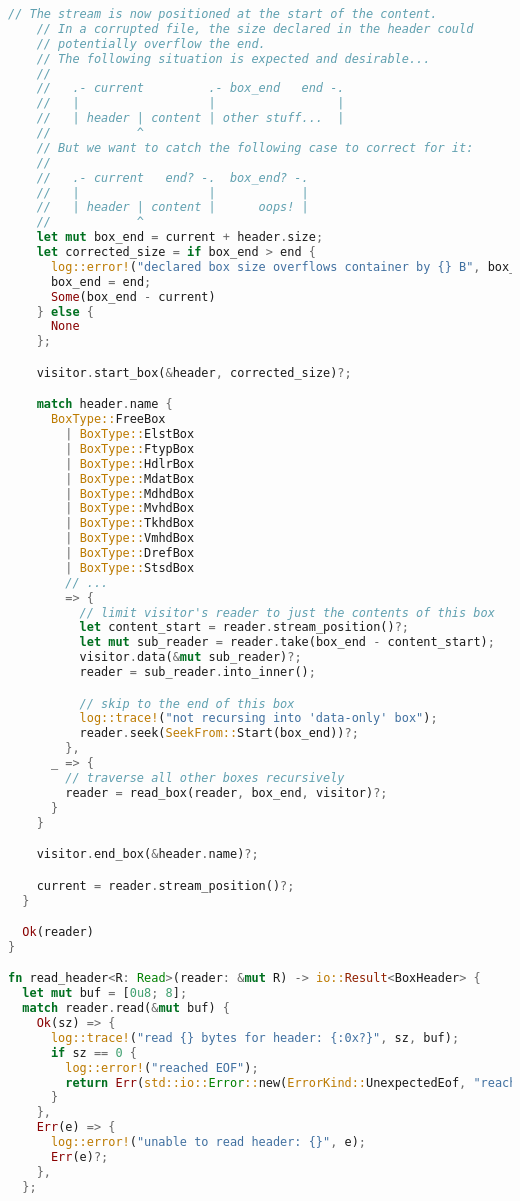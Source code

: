 \begin{lstlisting}[language=Rust]
    // The stream is now positioned at the start of the content.
    // In a corrupted file, the size declared in the header could
    // potentially overflow the end.
    // The following situation is expected and desirable...
    //
    //   .- current         .- box_end   end -.
    //   |                  |                 |
    //   | header | content | other stuff...  |
    //            ^
    // But we want to catch the following case to correct for it:
    //
    //   .- current   end? -.  box_end? -.
    //   |                  |            |
    //   | header | content |      oops! |
    //            ^
    let mut box_end = current + header.size;
    let corrected_size = if box_end > end {
      log::error!("declared box size overflows container by {} B", box_end - end);
      box_end = end;
      Some(box_end - current)
    } else {
      None
    };

    visitor.start_box(&header, corrected_size)?;

    match header.name {
      BoxType::FreeBox
        | BoxType::ElstBox
        | BoxType::FtypBox
        | BoxType::HdlrBox
        | BoxType::MdatBox
        | BoxType::MdhdBox
        | BoxType::MvhdBox
        | BoxType::TkhdBox
        | BoxType::VmhdBox
        | BoxType::DrefBox
        | BoxType::StsdBox
        // ...
        => {
          // limit visitor's reader to just the contents of this box
          let content_start = reader.stream_position()?;
          let mut sub_reader = reader.take(box_end - content_start);
          visitor.data(&mut sub_reader)?;
          reader = sub_reader.into_inner();

          // skip to the end of this box
          log::trace!("not recursing into 'data-only' box");
          reader.seek(SeekFrom::Start(box_end))?;
        },
      _ => {
        // traverse all other boxes recursively
        reader = read_box(reader, box_end, visitor)?;
      }
    }

    visitor.end_box(&header.name)?;

    current = reader.stream_position()?;
  }

  Ok(reader)
}

fn read_header<R: Read>(reader: &mut R) -> io::Result<BoxHeader> {
  let mut buf = [0u8; 8];
  match reader.read(&mut buf) {
    Ok(sz) => {
      log::trace!("read {} bytes for header: {:0x?}", sz, buf);
      if sz == 0 {
        log::error!("reached EOF");
        return Err(std::io::Error::new(ErrorKind::UnexpectedEof, "reached EOF"));
      }
    },
    Err(e) => {
      log::error!("unable to read header: {}", e);
      Err(e)?;
    },
  };


\end{lstlisting}
